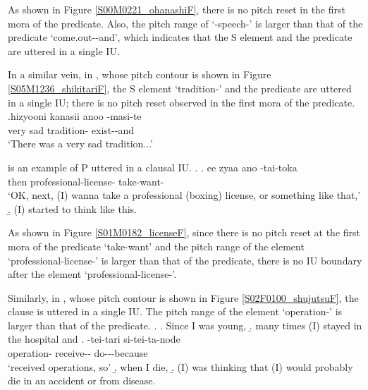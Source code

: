 As shown in Figure \ref{S00M0221_ohanashiF},
there is no pitch reset in the first mora of the predicate.
Also,
the pitch range of  `-speech-' is larger
than that of the predicate  `come.out--and',
which indicates that the S element and the predicate are uttered in a single IU.

In a similar vein, in \Next,
whose pitch contour is shown in Figure \ref{S05M1236_shikitariF},
the S element  `tradition-' and the predicate
are uttered in a single IU;
there is no pitch reset observed in the first mora of the predicate.
%
\exg.\label{S05M1236_shikitari}hizyooni kanasii \tp{\dvline} anoo \tp{\dvline}  -masi-te \tp{\dvline} \\
	very sad {}  {} tradition- exist--and {} \\
	`There was a very sad tradition...'

\Next[a] is an example of P uttered in a clausal IU.
%
\ex.\label{S01M0182_license}
 \ag. ee zyaa \tp{\dvline} ano  -tai-toka \tp{\dvline} \\
 		 then {}  professional-license- take-want- {} \\
		`OK, next, (I) wanna take a professional (boxing) license, or something like that,'
 \b. (I) started to think like this.

As shown in Figure \ref{S01M0182_licenseF},
since there is no pitch reset at the first mora of the predicate  `take-want' and the pitch range of the element  `professional-license-' is larger than that of the predicate,
there is no IU boundary after the element  `professional-license-'.

Similarly, in \Next[c],
whose pitch contour is shown in Figure \ref{S02F0100_shujutsuF},
the clause is uttered in a single IU.
The pitch range of the element  `operation-'
is larger than that of the predicate.
%
\ex.\label{S02F0100_shujutsu}
 \a. Since I was young,
 \b. many times (I) stayed in the hospital and
 \bg.  -tei-tari \tp{\dvline} si-tei-ta-node \tp{\dvline} \\
 		operation- receive-- {} do---because {} \\
		`received operations, so'
 \b. when I die,
 \b. (I) was thinking that (I) would probably die in an accident or from disease.

